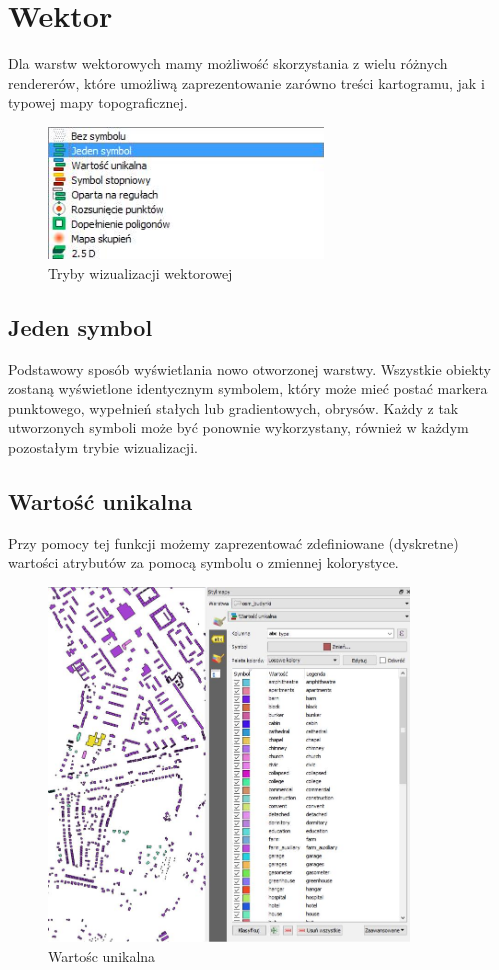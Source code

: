 \documentclass[12pt,a4paper]{book}
\begin{document}
\section{Wektor}
Dla warstw wektorowych mamy możliwość skorzystania z wielu różnych rendererów, które umożliwą zaprezentowanie zarówno treści kartogramu, jak i typowej mapy topograficznej.
\begin{figure}[!ht]
	\centering
	\includegraphics[height=3.50cm]{007-wektor-tryby.jpg}
	\caption{Tryby wizualizacji wektorowej}
\end{figure}
\subsection{Jeden symbol}
Podstawowy sposób wyświetlania nowo otworzonej warstwy. Wszystkie obiekty zostaną wyświetlone identycznym symbolem, który może mieć postać markera punktowego, wypełnień stałych lub gradientowych, obrysów. Każdy z tak utworzonych symboli może być ponownie wykorzystany, również w każdym pozostałym trybie wizualizacji. 
\subsection{Wartość unikalna}
Przy pomocy tej funkcji możemy zaprezentować zdefiniowane (dyskretne) wartości atrybutów za pomocą symbolu o zmiennej kolorystyce.

\begin{figure}[ht]
	\centering
	\includegraphics[height=9.4cm]{007-wektor-unikalna.jpg}
	\caption{Wartośc unikalna}
\end{figure}
\end{document}
